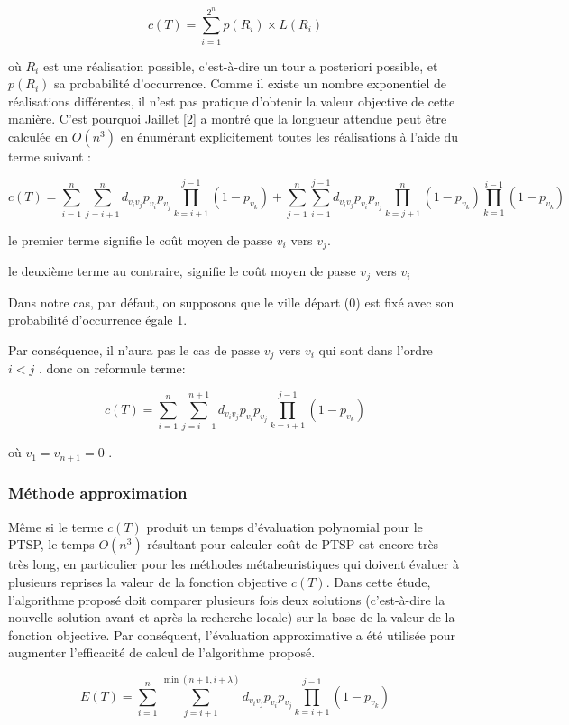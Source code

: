 \documentclass[]{article}
\begin{document}
\[c(T) = \sum_{i=1}^{2^n}p(R_i)\times L(R_i)\]

où \(R_i\) est une réalisation possible, c'est-à-dire un tour a
posteriori possible, et \(p(R_i )\) sa probabilité d'occurrence. Comme
il existe un nombre exponentiel de réalisations différentes, il n'est
pas pratique d'obtenir la valeur objective de cette manière. C'est
pourquoi Jaillet {[}2{]} a montré que la longueur attendue peut être
calculée en \(O(n^3 )\) en énumérant explicitement toutes les
réalisations à l'aide du terme suivant :

\[c(T) = \sum_{i=1}^n \sum_{j=i+1}^{n}d_{v_iv_j}p_{v_i}p_{v_j}\prod_{k=i+1}^{j-1}(1-p_{v_k}) + \sum_{j=1}^n \sum_{i=1}^{j-1}d_{v_iv_j}p_{v_i}p_{v_j}\prod_{k=j+1}^n(1-p_{v_k})\prod_{k=1}^{i-1}(1-p_{v_k})\]

le premier terme signifie le coût moyen de passe \(v_i\) vers \(v_j\).

le deuxième terme au contraire, signifie le coût moyen de passe \(v_j\)
vers \(v_i\)

Dans notre cas, par défaut, on supposons que le ville départ (0) est
fixé avec son probabilité d'occurrence égale 1.

Par conséquence, il n'aura pas le cas de passe \(v_j\) vers \(v_i\) qui
sont dans l'ordre \(i<j\) . donc on reformule terme:

\[c(T) = \sum_{i=1}^n \sum_{j=i+1}^{n+1}d_{v_iv_j}p_{v_i}p_{v_j}\prod_{k=i+1}^{j-1}(1-p_{v_k})\]

où \(v_1= v_{n+1} =0 \) .

\hypertarget{muxe9thode-approximation}{%
\subsubsection{Méthode approximation}\label{muxe9thode-approximation}}

Même si le terme \(c(T)\) produit un temps d'évaluation polynomial pour
le PTSP, le temps \(O(n^3 )\) résultant pour calculer coût de PTSP est
encore très très long, en particulier pour les méthodes métaheuristiques
qui doivent évaluer à plusieurs reprises la valeur de la fonction
objective \(c(T)\). Dans cette étude, l'algorithme proposé doit comparer
plusieurs fois deux solutions (c'est-à-dire la nouvelle solution avant
et après la recherche locale) sur la base de la valeur de la fonction
objective. Par conséquent, l'évaluation approximative a été utilisée
pour augmenter l'efficacité de calcul de l'algorithme proposé.

\[E(T) = \sum_{i=1}^n \sum_{j=i+1}^{\min (n+1,i+\lambda )}d_{v_iv_j}p_{v_i}p_{v_j}\prod_{k=i+1}^{j-1}(1-p_{v_k})\]
\end{document}
